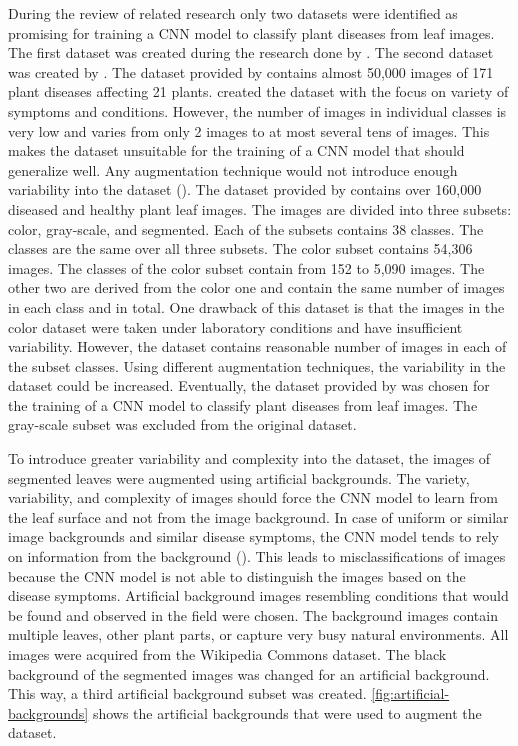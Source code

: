 \documentclass{BachelorBUI}
\begin{document}
        During the review of related research only two datasets were identified as promising for training a CNN model to classify plant diseases from leaf images. The first dataset was created during the research done by \textcite{Mohanty:2016}. The second dataset was created by \textcite{Barbedo:2018:1}. The dataset provided by \textcite{Barbedo:2018:2} contains almost 50,000 images of 171 plant diseases affecting 21 plants. \textcite{Barbedo:2018:2} created the dataset with the focus on variety of symptoms and conditions. However, the number of images in individual classes is very low and varies from only 2 images to at most several tens of images. This makes the dataset unsuitable for the training of a CNN model that should generalize well. Any augmentation technique would not introduce enough variability into the dataset (\cite{Barbedo:2018:2}). The dataset provided by \textcite{Mohanty:2016} contains over 160,000 diseased and healthy plant leaf images. The images are divided into three subsets: color, gray-scale, and segmented. Each of the subsets contains 38 classes. The classes are the same over all three subsets. The color subset contains 54,306 images. The classes of the color subset contain from 152 to 5,090 images. The other two are derived from the color one and contain the same number of images in each class and in total. One drawback of this dataset is that the images in the color dataset were taken under laboratory conditions and have insufficient variability. However, the dataset contains reasonable number of images in each of the subset classes. Using different augmentation techniques, the variability in the dataset could be increased. Eventually, the dataset provided by \textcite{Mohanty:2016} was chosen for the training of a CNN model to classify plant diseases from leaf images. The gray-scale subset was excluded from the original dataset.

        To introduce greater variability and complexity into the dataset, the images of segmented leaves were augmented using artificial backgrounds. The variety, variability, and complexity of images should force the CNN model to learn from the leaf surface and not from the image background. In case of uniform or similar image backgrounds and similar disease symptoms, the CNN model tends to rely on information from the background (\cite{Barbedo:2018:1}). This leads to misclassifications of images because the CNN model is not able to distinguish the images based on the disease symptoms. Artificial background images resembling conditions that would be found and observed in the field were chosen. The background images contain multiple leaves, other plant parts, or capture very busy natural environments. All images were acquired from the Wikipedia Commons dataset. The black background of the segmented images was changed for an artificial background. This way, a third artificial background subset was created. \autoref{fig:artificial-backgrounds} shows the artificial backgrounds that were used to augment the dataset.
\end{document}
